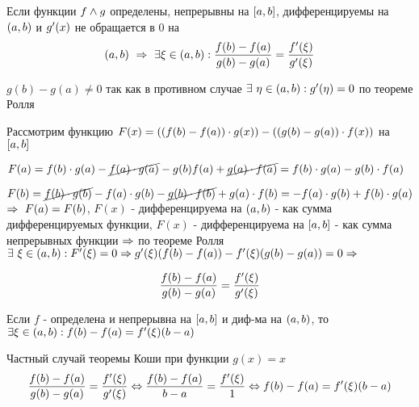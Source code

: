 \begin{proofs}
	Если функции $f \wedge g$ определены, непрерывны на $\left[ a,b\right]$, дифференцируемы на $\left( a,b\right)$ и $g^{\prime}(x)$  не обращается в $0$ на $$\left( a,b\right) \ \Rightarrow \ \exists \xi \in \left( a,b\right): \frac{f(b)-f(a)}{g(b)-g(a)} = \frac{f^{\prime}(\xi)}{g^{\prime}(\xi)}$$

	\begin{dokvo}
		\begin{enumerate*}
			\item $g(b) - g(a) \neq 0$ так как в противном случае $\exists \ \eta \in \left( a,b\right): g^{\prime}(\eta) = 0$ по теореме Ролля
			\item Рассмотрим функцию $F(x) = \left( \left( f(b)-f(a)\right)\cdot g(x)\right) - \left( \left( g(b)-g(a)\right)\cdot f(x)\right)$ на $\left[ a,b\right]$

			$F(a) = f(b)\cdot g(a) - \cancel{f(a)\cdot g(a)} - g(b)f(a) + \cancel{g(a)\cdot f(a)} = f(b)\cdot g(a)-g(b)\cdot f(a)$

			$F(b) = \cancel{f(b)\cdot g(b)} - f(a)\cdot g(b) - \cancel{g(b)\cdot f(b)} + g(a)\cdot f(b) = -f(a)\cdot g(b)+f(b)\cdot g(a)$ $\Rightarrow \ F(a) = F(b)$, $F(x)$ - дифференцируема на $\left( a,b\right)$ - как сумма дифференцируемых функции, $F(x)$ - дифференцируема на $\left[ a,b\right]$ - как сумма непрерывных функции $\Rightarrow$ по теореме Ролля $\exists \ \xi \in \left( a,b\right): F^{\prime}(\xi) = 0 \Rightarrow g^{\prime}(\xi)(f(b)-f(a))- f^{\prime}(\xi)(g(b)-g(a)) = 0 \Rightarrow$

			$$\frac{f(b)-f(a)}{g(b)-g(a)} = \frac{f^{\prime}(\xi)}{g^{\prime}(\xi)}$$
		\end{enumerate*}
	\end{dokvo}
\end{proofs}

\begin{proofs}
	Если $f$ - определена и непрерывна на $\left[ a,b\right]$ и диф-ма на $\left( a,b\right)$, то $\exists \xi \in \left( a,b\right): f(b) - f(a) = f^{\prime}(\xi)(b-a)$

	\begin{dokvo}
		Частный случай теоремы Коши при функции $g(x) = x$
		$$ \frac{f(b)-f(a)}{g(b)-g(a)} = \frac{f^{\prime}(\xi)}{g^{\prime}(\xi)} \Leftrightarrow \frac{f(b)-f(a)}{b-a} = \frac{f^{\prime}(\xi)}{1} \Leftrightarrow f(b) - f(a) = f^{\prime}(\xi)(b-a)$$
	\end{dokvo}
\end{proofs}
\newpage
